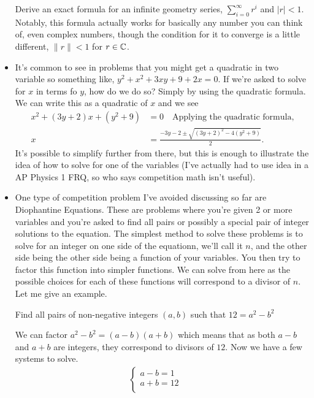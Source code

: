 \documentclass[11pt]{article}
\begin{document}
\begin{itemize}
    \begin{exercise}
        Derive an exact formula for an infinite geometry series, $\displaystyle \sum_{i=0}^\infty r^i$ and $|r| < 1$. Notably, this formula actually works for basically any number you can think of, even complex numbers, though the condition for it to converge is a little different, $\| r\| < 1$ for $r \in \mathbb C$.
    \end{exercise}
\item It's common to see in problems that you might get a quadratic in two variable so something like,  $y^2+x^2+3xy+9+2x=0$. If we're asked to solve for $x$ in terms fo $y$, how do we do so?
Simply by using the quadratic formula. We can write this as a quadratic of $x$ and we see
\begin{equation*}
    \begin{aligned}
        x^2+(3y+2)x+(y^2+9) &=0 \quad \text{Applying the quadratic formula,} \\
        x & = \frac{-3y-2 \pm \sqrt{(3y+2)^2-4(y^2+9)}}{2}.
    \end{aligned}
\end{equation*}
It's possible to simplify further from there, but this is enough to illustrate the idea of how to solve for one of the variables (I've actually had to use idea in a AP Physics 1 FRQ, so who says competition math isn't useful).
\item One type of competition problem I've avoided discussing so far are Diophantine Equations. These are problems where you're given 2 or more variables and you're asked to find all pairs or possibly a special pair of integer solutions to the equation. The simplest method to solve these problems is to solve for an integer on one side of the equationn, we'll call it $n$, and the other side being 
 the other side being a function of your variables. You then try to factor this function into simpler functions. We can solve from here as the possible choices for each of these functions  will correspond to a divisor of $n$. Let me give an example.
 \begin{example}
 Find all pairs of non-negative integers $(a, b)$ such that $12 = a^2-b^2$
 \end{example}
 We can factor $a^2-b^2 = (a-b)(a+b)$ which means that as both $a-b$ and $a+b$ are integers, they correspond to divisors of $12$. Now we have a few systems to solve.
 \[
 \begin{array}{rrr}
    \begin{cases}   
        a-b=1\\
        a+b=12\\
    \end{cases} & 
     &
    

\end{array}\]
\end{itemize}
\end{document}
